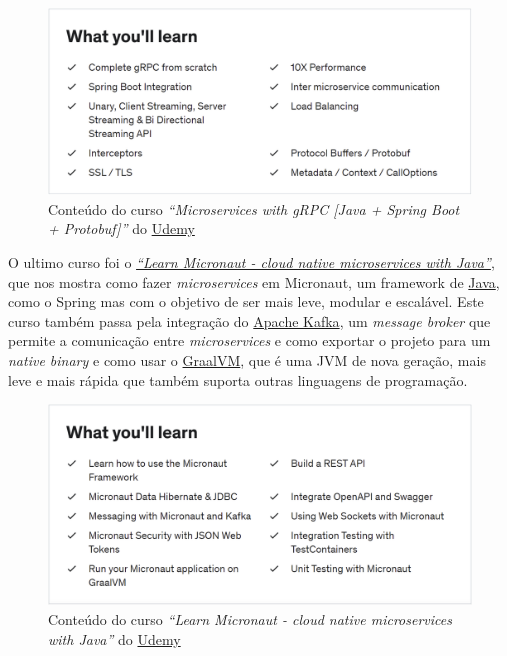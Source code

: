 \begin{figure}[!hbt]
  \centering
  \includegraphics[width=14cm]{figuras/udemy2.png}
  \caption{Conteúdo do curso \textit{``Microservices with gRPC [Java + Spring Boot + Protobuf]''} do \href{https://www.udemy.com/}{Udemy}}
  \label{fig:udemy2}
\end{figure}
\FloatBarrier

O ultimo curso foi o \href{https://www.udemy.com/course/learn-micronaut/}{\textit{``Learn Micronaut - cloud native microservices with Java''}}, que nos mostra como fazer \textit{microservices} em Micronaut, um framework de \href{https://jdk.java.net/}{Java}, como o Spring mas com o objetivo de ser mais leve, modular e escalável. Este curso também passa pela integração do \href{https://kafka.apache.org/}{Apache Kafka}, um \textit{message broker} que permite a comunicação entre \textit{microservices} e como exportar o projeto para um \textit{native binary} e como usar o \href{https://www.graalvm.org/}{GraalVM}, que é uma JVM de nova geração, mais leve e mais rápida que também suporta outras linguagens de programação.

\begin{figure}[!hbt]
  \centering
  \includegraphics[width=14cm]{figuras/udemy3.png}
  \caption{Conteúdo do curso \textit{``Learn Micronaut - cloud native microservices with Java''} do \href{https://www.udemy.com/}{Udemy}}
  \label{fig:udemy3}
\end{figure}
\FloatBarrier
